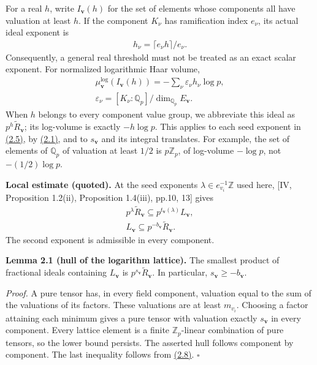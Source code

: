 \documentclass[11pt,a4paper]{amsart}
\begin{document}
For a real $h$, write $I_{\mathbf v}(h)$ for the set of elements whose components all have valuation at least $h$. If the component $K_\nu$ has ramification index $e_\nu$, its actual ideal exponent is
\begin{equation}
\begin{gathered}
h_\nu=\lceil e_\nu h\rceil/e_\nu.
\end{gathered}
\tag{2.6}\label{eq:2.6}
\end{equation}
Consequently, a general real threshold must not be treated as an exact scalar exponent. For normalized logarithmic Haar volume,
\begin{equation}
\begin{gathered}
\mu_{\mathbf v}^{\log}(I_{\mathbf v}(h))=-\sum_\nu\varepsilon_\nu h_\nu\log p,\\ \varepsilon_\nu=[K_\nu:\mathbb Q_p]/\dim_{\mathbb Q_p}E_{\mathbf v}.
\end{gathered}
\tag{2.7}\label{eq:2.7}
\end{equation}
When $h$ belongs to every component value group, we abbreviate this ideal as $p^h\widetilde R_{\mathbf v}$; its log-volume is exactly $-h\log p$. This applies to each seed exponent in \hyperref[eq:2.5]{(2.5)}, by \hyperref[eq:2.1]{(2.1)}, and to $s_{\mathbf v}$ and its integral translates. For example, the set of elements of $\mathbb Q_p$ of valuation at least $1/2$ is $p\mathbb Z_p$, of log-volume $-\log p$, not $-(1/2)\log p$.


\textbf{Local estimate (quoted).} At the seed exponents $\lambda\in e_{v_i}^{-1}\mathbb Z$ used here, [IV, Proposition 1.2(ii), Proposition 1.4(iii), pp.10, 13] gives
\begin{equation}
\begin{gathered}
p^\lambda\widetilde R_{\mathbf v}\subseteq p^{t_{\mathbf v}(\lambda)}L_{\mathbf v},\\
L_{\mathbf v}\subseteq p^{-b_{\mathbf v}}\widetilde R_{\mathbf v}.
\end{gathered}
\tag{2.8}\label{eq:2.8}
\end{equation}
The second exponent is admissible in every component.


\par\smallskip\noindent\textbf{Lemma 2.1 (hull of the logarithm lattice).} The smallest product of fractional ideals containing $L_{\mathbf v}$ is $p^{s_{\mathbf v}}\widetilde R_{\mathbf v}$. In particular, $s_{\mathbf v}\ge-b_{\mathbf v}$.


\emph{Proof.} A pure tensor has, in every field component, valuation equal to the sum of the valuations of its factors. These valuations are at least $m_{v_i}$. Choosing a factor attaining each minimum gives a pure tensor with valuation exactly $s_{\mathbf v}$ in every component. Every lattice element is a finite $\mathbb Z_p$-linear combination of pure tensors, so the lower bound persists. The asserted hull follows component by component. The last inequality follows from \hyperref[eq:2.8]{(2.8)}. \hfill$\square$
\end{document}
